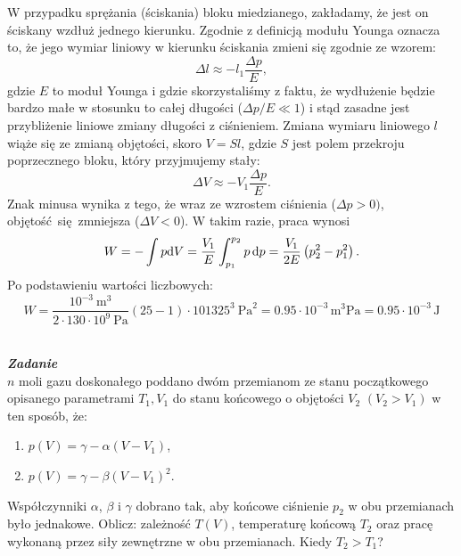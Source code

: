 \documentclass[11pt,a4paper]{article}
\newcounter{zadanie}\newcommand{\zadanie}[1][]{\addtocounter{zadanie}{1} ~\\  {\bf \emph{Zadanie \arabic{zadanie} #1 }} \\}
\renewcommand{\t}[1]{\textrm{#1}}
\begin{document}
W przypadku sprężania (ściskania) bloku miedzianego, zakładamy, że jest on ściskany wzdłuż jednego kierunku. Zgodnie z definicją modułu Younga oznacza to,  że jego wymiar liniowy w kierunku ściskania zmieni się zgodnie ze wzorem:
$$
\Delta l \approx -l_1 \frac{\Delta p}{E},
$$
gdzie $E$ to moduł Younga i gdzie skorzystaliśmy z faktu, że wydłużenie będzie bardzo małe w stosunku
to całej długości ($\Delta p /E \ll 1$) i stąd zasadne jest przybliżenie liniowe zmiany długości z ciśnieniem.
Zmiana wymiaru liniowego $l$ wiąże się ze zmianą objętości, skoro $V = S l$,
 gdzie $S$ jest polem przekroju poprzecznego bloku, który przyjmujemy stały:
$$
\Delta V \approx   - V_1 \frac{\Delta p}{E}.
$$
Znak minusa wynika z tego, że wraz ze wzrostem ciśnienia ($\Delta p > 0)$, objętość się zmniejsza ($\Delta V < 0$). 
W takim razie, praca wynosi
$$
W = - \int p {\rm d}V = \frac{V_1}{E} \int_{p_1}^{p_2} p\, {\rm d} p = 
\frac{V_1}{2E} \left(p_2^2 - p_1^2 \right).
$$
Po podstawieniu wartości liczbowych:
$$
W = \frac{10^{-3}~\t{m}^{3}}{2 \cdot 130 \cdot 10^{9}~\t{Pa}}(25 - 1)\cdot 101325^{3}~\t{Pa}^{2} 
=  0.95 \cdot 10^{-3}\,\t{m}^{3}\t{Pa} =  0.95 \cdot 10^{-3}\,\t{J}
$$

\newpage
\zadanie
$n$ moli gazu doskonałego poddano dwóm przemianom ze stanu początkowego
opisanego parametrami $T_1, V_1$ do stanu końcowego o objętości $V_2$
$(V_2>V_1)$ w ten
sposób, że:\begin{enumerate}
\item $p(V) = \gamma - \alpha (V-V_1)$,
\item $p(V) = \gamma - \beta (V-V_1)^2$.
\end{enumerate}
Współczynniki $\alpha$, $\beta$ i $\gamma$ dobrano tak,
aby końcowe ciśnienie $p_2$ w obu przemianach było jednakowe.
Oblicz: zależność $T(V)$, temperaturę końcową $T_2$
oraz pracę wykonaną przez siły zewnętrzne w obu przemianach.
Kiedy $T_2>T_1$?
\end{document}
